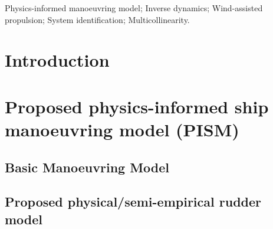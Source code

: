 \documentclass[preprint,12pt,authoryear]{elsarticle}
\begin{document}
\begin{frontmatter}

    \begin{abstract}
        

    \end{abstract}


    \begin{keyword}
    Physics-informed manoeuvring model; Inverse dynamics; Wind-assisted propulsion; System identification;  Multicollinearity.



    \end{keyword}

\end{frontmatter}


\section{Introduction}
\label{sec:introduction}

%
%
%
\section{Proposed physics-informed ship manoeuvring model (PISM)}
\label{sec:ship_models}

\FloatBarrier
\subsection{Basic Manoeuvring Model}
\label{sec:models}

%
\subsection{Proposed physical/semi-empirical rudder model}
\label{sec:semiempirical_rudder_model}

%
\end{document}
